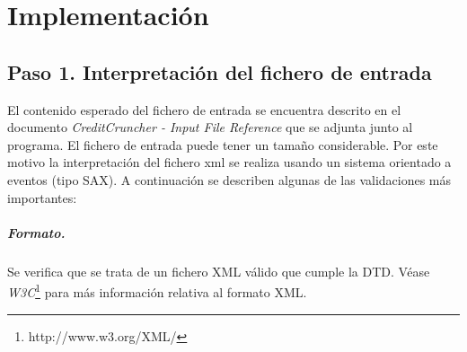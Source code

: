 
%
%
%
%
%
%
%
%

\chapter{Implementaci\'on}
\label{sec:implementation}


\section{Paso 1. Interpretaci\'on del fichero de entrada}

El contenido esperado del fichero de entrada se encuentra
descrito en el documento \emph{CreditCruncher - Input File Reference}
que se adjunta junto al programa.
\newline
\newline
El fichero de entrada puede tener un tama\~no considerable. Por
este motivo la interpretaci\'on del fichero xml se realiza usando un
sistema orientado a eventos (tipo SAX). A continuaci\'on se
describen algunas de las validaciones m\'as importantes:

\paragraph{Formato.} Se verifica que se trata de un fichero XML
v\'alido que cumple la DTD. V\'ease \emph{W3C}\footnote{http://www.w3.org/XML/}
para m\'as informaci\'on relativa al formato XML.

